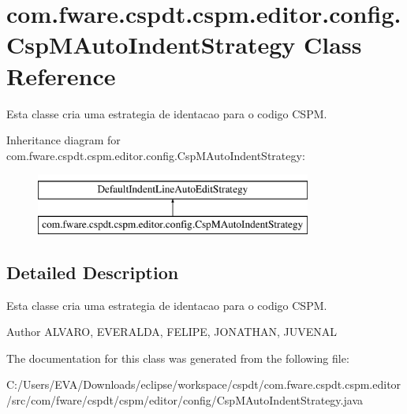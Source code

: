 \hypertarget{classcom_1_1fware_1_1cspdt_1_1cspm_1_1editor_1_1config_1_1_csp_m_auto_indent_strategy}{}\section{com.\+fware.\+cspdt.\+cspm.\+editor.\+config.\+Csp\+M\+Auto\+Indent\+Strategy Class Reference}
\label{classcom_1_1fware_1_1cspdt_1_1cspm_1_1editor_1_1config_1_1_csp_m_auto_indent_strategy}


Esta classe cria uma estrategia de identacao para o codigo C\+S\+PM.  


Inheritance diagram for com.\+fware.\+cspdt.\+cspm.\+editor.\+config.\+Csp\+M\+Auto\+Indent\+Strategy\+:\begin{figure}[H]
\begin{center}
\leavevmode
\includegraphics[height=2.000000cm]{classcom_1_1fware_1_1cspdt_1_1cspm_1_1editor_1_1config_1_1_csp_m_auto_indent_strategy}
\end{center}
\end{figure}


\subsection{Detailed Description}
Esta classe cria uma estrategia de identacao para o codigo C\+S\+PM. 

\begin{DoxyAuthor}{Author}
A\+L\+V\+A\+RO, E\+V\+E\+R\+A\+L\+DA, F\+E\+L\+I\+PE, J\+O\+N\+A\+T\+H\+AN, J\+U\+V\+E\+N\+AL 
\end{DoxyAuthor}


The documentation for this class was generated from the following file\+:\begin{DoxyCompactItemize}
\item 
C\+:/\+Users/\+E\+V\+A/\+Downloads/eclipse/workspace/cspdt/com.\+fware.\+cspdt.\+cspm.\+editor/src/com/fware/cspdt/cspm/editor/config/Csp\+M\+Auto\+Indent\+Strategy.\+java\end{DoxyCompactItemize}
